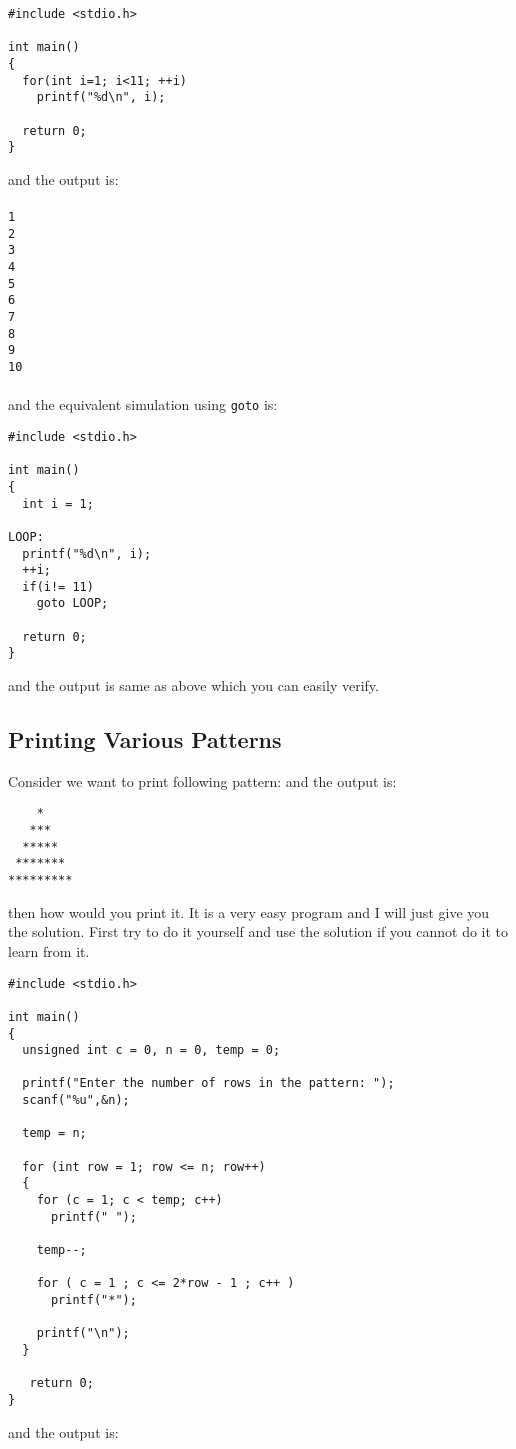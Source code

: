 \begin{verbatim}
#include <stdio.h>

int main()
{
  for(int i=1; i<11; ++i)
    printf("%d\n", i);

  return 0;
}
\end{verbatim}
and the output is:
\\\\\texttt{1\\
2\\
3\\
4\\
5\\
6\\
7\\
8\\
9\\
10\\\\}
and the equivalent simulation using \texttt{goto} is:

\begin{verbatim}
#include <stdio.h>

int main()
{
  int i = 1;

LOOP:
  printf("%d\n", i);
  ++i;
  if(i!= 11)
    goto LOOP;

  return 0;
}
\end{verbatim}
and the output is same as above which you can easily verify.

\subsection{Printing Various Patterns}
Consider we want to print following pattern:
and the output is:
\begin{verbatim}
    *
   ***
  *****
 *******
*********
\end{verbatim}
 
then how would you print it. It is a very easy program and I will just give you
the solution. First try to do it yourself and use the solution if you cannot do
it to learn from it.

\begin{verbatim}
#include <stdio.h>
 
int main()
{
  unsigned int c = 0, n = 0, temp = 0;
 
  printf("Enter the number of rows in the pattern: ");
  scanf("%u",&n);
 
  temp = n;
 
  for (int row = 1; row <= n; row++)
  {
    for (c = 1; c < temp; c++)
      printf(" ");
 
    temp--;
 
    for ( c = 1 ; c <= 2*row - 1 ; c++ )
      printf("*");
 
    printf("\n");
  }
 
   return 0;
}
\end{verbatim}
and the output is:

